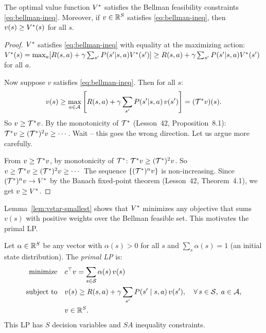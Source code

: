\documentclass[11pt,a4paper]{article}
\begin{document}
\begin{lemma}
\label{lem:vstar-smallest}
The optimal value function $V^*$ satisfies the Bellman
feasibility constraints \eqref{eq:bellman-ineq}. Moreover, if
$v \in \mathbb{R}^S$ satisfies \eqref{eq:bellman-ineq}, then
$v(s) \geq V^*(s)$ for all $s$.
\end{lemma}

\begin{proof}
$V^*$ satisfies \eqref{eq:bellman-ineq} with equality at the
maximizing action: $V^*(s) = \max_a [R(s,a) + \gamma \sum_{s'}
P(s'|s,a) V^*(s')] \geq R(s,a) + \gamma \sum_{s'} P(s'|s,a)
V^*(s')$ for all $a$.

Now suppose $v$ satisfies \eqref{eq:bellman-ineq}. Then for all $s$:
\[
    v(s) \geq \max_{a \in \mathcal{A}} \left[ R(s,a) + \gamma
    \sum_{s'} P(s'|s,a)\, v(s') \right] = (\mathcal{T}^* v)(s).
\]
So $v \geq \mathcal{T}^* v$. By the monotonicity of $\mathcal{T}^*$
(Lesson~42, Proposition~8.1):
$\mathcal{T}^* v \geq (\mathcal{T}^*)^2 v \geq \cdots$. Wait -- this
goes the wrong direction. Let us argue more carefully.

From $v \geq \mathcal{T}^* v$, by monotonicity of $\mathcal{T}^*$:
$\mathcal{T}^* v \geq (\mathcal{T}^*)^2 v$. So
$v \geq \mathcal{T}^* v \geq (\mathcal{T}^*)^2 v \geq \cdots$
The sequence $\{(\mathcal{T}^*)^n v\}$ is non-increasing. Since
$(\mathcal{T}^*)^n v \to V^*$ by the Banach fixed-point theorem
(Lesson~42, Theorem~4.1), we get $v \geq V^*$.
\end{proof}

Lemma~\ref{lem:vstar-smallest} shows that $V^*$ minimizes any
objective that sums $v(s)$ with positive weights over the Bellman
feasible set. This motivates the primal LP.

\begin{definition}
\label{def:primal-lp}
Let $\alpha \in \mathbb{R}^S$ be any vector with $\alpha(s) > 0$ for all
$s$ and $\sum_s \alpha(s) = 1$ (an initial state distribution).
The \emph{primal LP} is:
\begin{equation}
\label{eq:primal-lp}
\begin{aligned}
    \text{minimize} \quad & c^\top v = \sum_{s \in \mathcal{S}}
    \alpha(s)\, v(s) \\
    \text{subject to} \quad & v(s) \geq R(s,a) + \gamma
    \sum_{s'} P(s' \mid s,a)\, v(s'), \quad
    \forall\, s \in \mathcal{S},\; a \in \mathcal{A}, \\
    & v \in \mathbb{R}^S.
\end{aligned}
\end{equation}
This LP has $S$ decision variables and $SA$ inequality constraints.
\end{definition}
\end{document}
